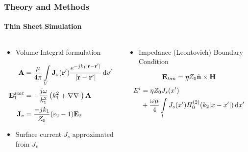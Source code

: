 \documentclass[mathserif,16pt,xcolor=table]{beamer}
\begin{document}
      \begin{frame}
      \frametitle{Theory and Methods}
      \framesubtitle{Thin Sheet Simulation}
      \begin{columns}[T] %
      \begin{column}{.5\textwidth}
        \begin{itemize}
          \item{Volume Integral formulation}
        \end{itemize}
        \begin{equation} \nonumber
          \begin{split}
            \mathbf{A} &= \frac{\mu}{4 \pi} \int\limits_{V} \mathbf{J}_v(\mathbf{r}')  \frac{ e^{-j k_1 |\mathbf{r} - \mathbf{r}'|}}{|\mathbf{r} - \mathbf{r}'|} \mathop{}\!\mathrm{d}{v'} \\
            \mathbf{E}_1^{scat} &= -\frac{j \omega}{k_1^2} \left( k_1^2 + \nabla \nabla \cdot \right) \mathbf{A} \\
            \mathbf{J}_v &= \frac{-j k_1}{Z_0}(\varepsilon_2 - 1)\mathbf{E}_2
          \end{split}
          \label{eq:E1sc}
        \end{equation}
        \begin{itemize}
          \item{Surface current $J_s$ approximated from $J_v$}
        \end{itemize}
      \end{column}
      \begin{column}[T]{.5\textwidth}
        \begin{itemize}
          \item{Impedance (Leontovich) Boundary Condition}
        \end{itemize}
        \begin{equation} \nonumber
          \mathbf{E}_{tan} = \eta Z_0 \hat{\mathbf{n}} \times \mathbf{H}
          \label{eq:eps}
        \end{equation}
        \begin{equation} \nonumber
          \begin{split}
            E^i &= \eta Z_0 J_s(x') \\
            & + \frac{\omega \mu}{4}  \int\limits_{l} J_s(x')  H_0^{(2)}(k_2 |x - x'|) \mathop{}\!\mathrm{d}{x'}
          \end{split}
          \label{eq:eps}
        \end{equation}
        \end{column}%
      \end{columns}
      \end{frame}
\end{document}
